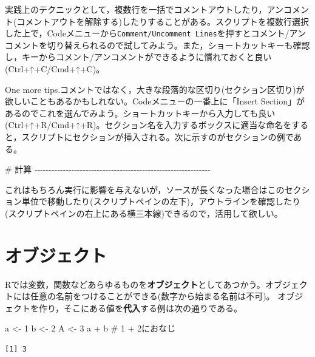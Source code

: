 \documentclass[
  a4paper,
]{ltjsbook}
\newenvironment{Shaded}{\begin{snugshade}}{\end{snugshade}}
\newcommand{\CommentTok}[1]{\textcolor[rgb]{0.37,0.37,0.37}{#1}}
\newcommand{\DecValTok}[1]{\textcolor[rgb]{0.68,0.00,0.00}{#1}}
\newcommand{\NormalTok}[1]{\textcolor[rgb]{0.00,0.23,0.31}{#1}}
\newcommand{\OtherTok}[1]{\textcolor[rgb]{0.00,0.23,0.31}{#1}}
\newcommand{\SpecialCharTok}[1]{\textcolor[rgb]{0.37,0.37,0.37}{#1}}
\begin{document}
実践上のテクニックとして，複数行を一括でコメントアウトしたり，アンコメント(コメントアウトを解除する)したりすることがある。スクリプトを複数行選択した上で，Codeメニューから\texttt{Comment/Uncomment\ Lines}を押すとコメント/アンコメントを切り替えられるので試してみよう。また，ショートカットキーも確認し，キーからコメント/アンコメントができるように慣れておくと良い(Ctrl+↑+C/Cmd+↑+C)。

One more
tips.コメントではなく，大きな段落的な区切り(セクション区切り)が欲しいこともあるかもしれない。Codeメニューの一番上に「Insert
Section」があるのでこれを選んでみよう。ショートカットキーから入力しても良い(Ctrl+↑+R/Cmd+↑+R)。セクション名を入力するボックスに適当な命名をすると，スクリプトにセクションが挿入される。次に示すのがセクションの例である。

\begin{Shaded}
\begin{Highlighting}[]
\CommentTok{\# 計算 {-}{-}{-}{-}{-}{-}{-}{-}{-}{-}{-}{-}{-}{-}{-}{-}{-}{-}{-}{-}{-}{-}{-}{-}{-}{-}{-}{-}{-}{-}{-}{-}{-}{-}{-}{-}{-}{-}{-}{-}{-}{-}{-}{-}{-}{-}{-}{-}{-}{-}{-}{-}{-}{-}{-}{-}{-}{-}{-}{-}{-}{-}}
\end{Highlighting}
\end{Shaded}

これはもちろん実行に影響を与えないが，ソースが長くなった場合はこのセクション単位で移動したり(スクリプトペインの左下)，アウトラインを確認したり(スクリプトペインの右上にある横三本線)できるので，活用して欲しい。

\section{オブジェクト}\label{ux30aaux30d6ux30b8ux30a7ux30afux30c8}

Rでは変数，関数などあらゆるものを\textbf{オブジェクト}としてあつかう。オブジェクトには任意の名前をつけることができる(数字から始まる名前は不可)。
オブジェクトを作り，そこにある値を\textbf{代入}する例は次の通りである。

\begin{Shaded}
\begin{Highlighting}[]
\NormalTok{a }\OtherTok{\textless{}{-}} \DecValTok{1}
\NormalTok{b }\OtherTok{\textless{}{-}} \DecValTok{2}
\NormalTok{A }\OtherTok{\textless{}{-}} \DecValTok{3}
\NormalTok{a }\SpecialCharTok{+}\NormalTok{ b }\CommentTok{\# 1 + 2におなじ}
\end{Highlighting}
\end{Shaded}

\begin{verbatim}
[1] 3
\end{verbatim}
\end{document}
